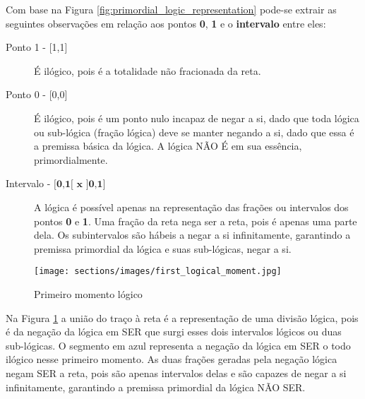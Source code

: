 Com base na Figura \ref{fig:primordial_logic_representation} pode-se extrair as seguintes observações em relação aos pontos \textbf{0}, \textbf{1} e o \textbf{intervalo} entre eles:
\begin{description}
   \item[Ponto 1 - {[1,1]}] É ilógico, pois é a totalidade não fracionada da reta.
   \item[Ponto 0 - {[0,0]}] É ilógico, pois é um ponto nulo incapaz de negar a si, dado que toda lógica ou sub-lógica (fração lógica) deve se manter negando a si, dado que essa é a premissa básica da lógica. A lógica NÃO É em sua essência, primordialmente.
   \item[Intervalo - $\textbf{{[0,1[ x ]0,1]}}$] A lógica é possível apenas na representação das frações ou intervalos dos pontos \textbf{0} e \textbf{1}. Uma fração da reta nega ser a reta, pois é apenas uma parte dela. Os subintervalos são hábeis a negar a si infinitamente, garantindo a premissa primordial da lógica e suas sub-lógicas, negar a si. 
\end{description}

\begin{figure}[H]
\caption{Primeiro momento lógico}
\label{fig:first_logical_moment}
\centering
\texttt{[image: sections/images/first\_logical\_moment.jpg]}
\end{figure}

Na Figura \ref{fig:first_logical_moment} a união do traço à reta é a representação de uma divisão lógica, pois é da negação da lógica em SER que surgi esses dois intervalos lógicos ou duas sub-lógicas. O segmento em azul representa a negação da lógica em SER o todo ilógico nesse primeiro momento. As duas frações geradas pela negação lógica negam SER a reta, pois são apenas intervalos delas e são capazes de negar a si infinitamente, garantindo a premissa primordial da lógica NÃO SER. 








